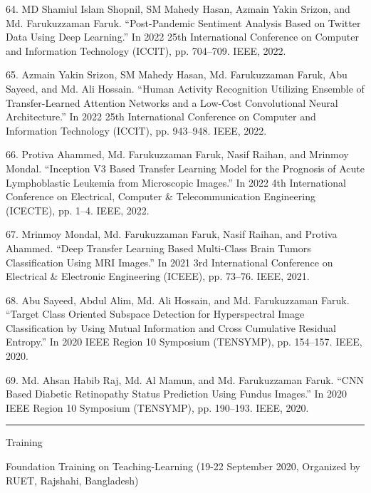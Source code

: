 \documentclass[a4paper,10pt]{article}
\newlength{\cvcolumngapwidth}
\newlength{\cvleftcolumnwidth}
\newlength{\cvrightcolumnwidth}
\newcommand{\cvsectionstyle}[1]{{\normalsize\cvsectionfont\textcolor{cvsectioncolor}{#1}}}
\newcommand{\cvdurationstyle}[1]{{\small\cvdurationfont\textcolor{cvdurationcolor}{#1}}}
\newcommand{\cvheadingstyle}[1]{{\normalsize\cvheadingfont\textcolor{cvheadingcolor}{#1}}}
\newlength{\cvafteritemskipamount}
\newlength{\cvaftersectionskipamount}
\newlength{\cvbetweensectionandheadingextraskipamount}
\newlength{\cvparskip}
\newcommand{\cvsection}[1]{
    \begin{minipage}[t]{\cvleftcolumnwidth}
        \raggedleft\cvsectionstyle{#1}
    \end{minipage}%
    \hspace{\cvcolumngapwidth}%
    \begin{minipage}[t]{\cvrightcolumnwidth}
        \textcolor{cvrulecolor}{\rule{\cvrightcolumnwidth}{0.3mm}}
    \end{minipage}

    \vspace{\cvaftersectionskipamount}
}
\newcommand{\cvitem}[2]{
    \begin{minipage}[t]{\cvleftcolumnwidth}
        \raggedleft #1
    \end{minipage}%
    \hspace{\cvcolumngapwidth}%
    \begin{minipage}[t]{\cvrightcolumnwidth}
        \setlength{\parskip}{\cvparskip} #2
    \end{minipage}

    \vspace{\cvafteritemskipamount}
}
\begin{document}
\cvitem{
    \cvdurationstyle{}
}{
64. MD Shamiul Islam Shopnil, SM Mahedy Hasan, Azmain Yakin Srizon, and Md. Farukuzzaman Faruk. “Post-Pandemic Sentiment Analysis Based on Twitter Data Using Deep Learning.” In 2022 25th International Conference on Computer and Information Technology (ICCIT), pp. 704–709. IEEE, 2022.
}

\cvitem{
    \cvdurationstyle{}
}{
65. Azmain Yakin Srizon, SM Mahedy Hasan, Md. Farukuzzaman Faruk, Abu Sayeed, and Md. Ali Hossain. “Human Activity Recognition Utilizing Ensemble of Transfer-Learned Attention Networks and a Low-Cost Convolutional Neural Architecture.” In 2022 25th International Conference on Computer and Information Technology (ICCIT), pp. 943–948. IEEE, 2022.
}

\cvitem{
    \cvdurationstyle{}
}{
66. Protiva Ahammed, Md. Farukuzzaman Faruk, Nasif Raihan, and Mrinmoy Mondal. “Inception V3 Based Transfer Learning Model for the Prognosis of Acute Lymphoblastic Leukemia from Microscopic Images.” In 2022 4th International Conference on Electrical, Computer \& Telecommunication Engineering (ICECTE), pp. 1–4. IEEE, 2022.
}

\cvitem{
    \cvdurationstyle{}
}{
67. Mrinmoy Mondal, Md. Farukuzzaman Faruk, Nasif Raihan, and Protiva Ahammed. “Deep Transfer Learning Based Multi-Class Brain Tumors Classification Using MRI Images.” In 2021 3rd International Conference on Electrical \& Electronic Engineering (ICEEE), pp. 73–76. IEEE, 2021.
}

\cvitem{
    \cvdurationstyle{}
}{
68. Abu Sayeed, Abdul Alim, Md. Ali Hossain, and Md. Farukuzzaman Faruk. “Target Class Oriented Subspace Detection for Hyperspectral Image Classification by Using Mutual Information and Cross Cumulative Residual Entropy.” In 2020 IEEE Region 10 Symposium (TENSYMP), pp. 154–157. IEEE, 2020.
}

\cvitem{
    \cvdurationstyle{}
}{
69. Md. Ahsan Habib Raj, Md. Al Mamun, and Md. Farukuzzaman Faruk. “CNN Based Diabetic Retinopathy Status Prediction Using Fundus Images.” In 2020 IEEE Region 10 Symposium (TENSYMP), pp. 190–193. IEEE, 2020.
}

\cvsection{TRAINING \& WORKSHOPS}

\vspace{\cvbetweensectionandheadingextraskipamount}

\cvitem{
    \cvheadingstyle{Training}
}
{
Foundation Training on Teaching-Learning (19-22 September 2020, Organized by RUET, Rajshahi, Bangladesh)
}
\end{document}
